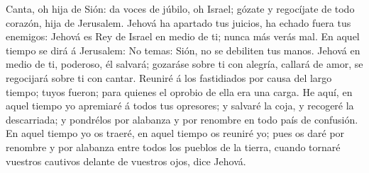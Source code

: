  Canta, oh hija de Sión: da voces de júbilo, oh Israel;
gózate y regocíjate de todo corazón, hija de Jerusalem. 
Jehová ha apartado tus juicios, ha echado fuera tus enemigos: Jehová es
Rey de Israel en medio de ti; nunca más verás mal.  En
aquel tiempo se dirá á Jerusalem: No temas: Sión, no se debiliten tus
manos.  Jehová en medio de ti, poderoso, él salvará;
gozaráse sobre ti con alegría, callará de amor, se regocijará sobre ti
con cantar.  Reuniré á los fastidiados por causa del largo
tiempo; tuyos fueron; para quienes el oprobio de ella era una carga.
 He aquí, en aquel tiempo yo apremiaré á todos tus
opresores; y salvaré la coja, y recogeré la descarriada; y pondrélos por
alabanza y por renombre en todo país de confusión.  En
aquel tiempo yo os traeré, en aquel tiempo os reuniré yo; pues os daré
por renombre y por alabanza entre todos los pueblos de la tierra, cuando
tornaré vuestros cautivos delante de vuestros ojos, dice Jehová.
